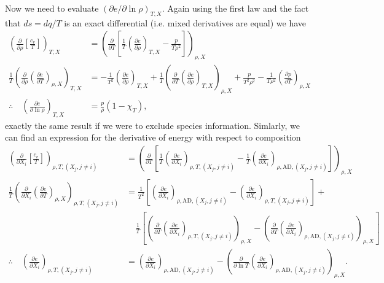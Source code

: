 Now we need to evaluate $\left(\partial e/\partial \ln\rho\right)_{T,X}$.
Again using the first law and the fact that $ds=dq/T$ is an exact 
differential (i.e. mixed derivatives are equal) we have
\begin{align}\label{eq:dedlnrho}
  \left(
  \frac{\partial}{\partial\rho}\left[\frac{c_v}{T}\right]\right)_{T,X} &=
  \left(\frac{\partial}{\partial T}\left[\frac{1}{T}
    \left(\frac{\partial e}{\partial\rho}\right)_{T,X} - \frac{p}{T\rho^2}
    \right]\right)_{\rho,X}{}\nonumber\\
  \frac{1}{T}\left(\frac{\partial}{\partial\rho}\left(
  \frac{\partial e}{\partial T}\right)_{\rho,X}\right)_{T,X} &=
  -\frac{1}{T^2}\left(\frac{\partial e}{\partial\rho}\right)_{T,X} +
  \frac{1}{T}\left(\frac{\partial}{\partial T}\left(
  \frac{\partial e}{\partial\rho}\right)_{T,X}\right)_{\rho,X}
  +\frac{p}{T^2\rho^2} - 
  \frac{1}{T\rho^2}\left(\frac{\partial p}{\partial T}\right)_{\rho,X}
  {}\nonumber\\
  \therefore\quad \left(\frac{\partial e}{\partial\ln \rho}\right)_{T,X} &=
  \frac{p}{\rho}\left(1-\chi_T\right),
\end{align}
exactly the same result if we were to exclude species information.
Simlarly, we can find an expression for the derivative of energy with 
respect to composition
\begin{align*}
  \left(\frac{\partial}{\partial X_i}\left[
    \frac{c_v}{T}\right]\right)_{\rho,T,(X_j,j\neq i)} &=
  \left(\frac{\partial}{\partial T}\left[
    \frac{1}{T}\left(\frac{\partial e}{\partial X_i}
      \right)_{\rho,T,(X_j,j\neq i)} - \frac{1}{T}\left(
      \frac{\partial e}{\partial X_i}\right)_{\rho,\text{AD},(X_j,j\neq i)}
    \right]\right)_{\rho,X}\\
  \frac{1}{T}\left(\frac{\partial }{\partial X_i}\left(
  \frac{\partial e}{\partial T}\right)_{\rho,X}\right)_{\rho,T,(X_j,j\neq i)}
  &= \frac{1}{T^2}\left[\left(\frac{\partial e}{\partial X_i}
    \right)_{\rho,\text{AD},(X_j,j\neq i)} - 
    \left(\frac{\partial e}{\partial X_i}\right)_{\rho,T,(X_j,j\neq i)}
    \right] + \\
  &\ \ \ \ \ \frac{1}{T}\left[
    \left(\frac{\partial}{\partial T}\left(
    \frac{\partial e}{\partial X_i}\right)_{\rho,T,(X_j,j\neq i)}
    \right)_{\rho,X} - 
    \left(\frac{\partial }{\partial T}\left(
    \frac{\partial e}{\partial X_i}\right)_{\rho,\text{AD},(X_j,j\neq i)}
    \right)_{\rho,X}\right]\\
  \therefore\quad 
  \left(\frac{\partial e}{\partial X_i}\right)_{\rho,T,(X_j,j\neq i)} &=
  \left(\frac{\partial e}{\partial X_i}
  \right)_{\rho,\text{AD},(X_j,j\neq i)} - \left(
  \frac{\partial}{\partial\ln T}\left(
  \frac{\partial e}{\partial X_i}\right)_{\rho,\text{AD},(X_j,j\neq i)}
  \right)_{\rho,X}.
\end{align*}
